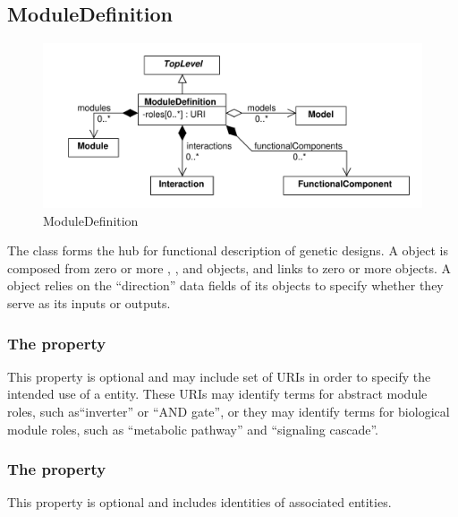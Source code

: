 \subsection{ModuleDefinition}
\label{sec:ModuleDefinition}

\begin{figure}[ht]
\begin{center}
\includegraphics[scale=0.6]{uml/module_definition}
\caption[]{ModuleDefinition}
\label{uml:module_definition}
\end{center}
\end{figure}

The  class forms the hub for functional description of genetic designs. A  object is composed from zero or more , , and  objects, and links to zero or more  objects. A  object relies on the ``direction'' data fields of its  objects to specify whether they serve as its inputs or outputs.

\subsubsection*{The  property}
This property is optional and may include  set of URIs in order to specify the intended use of a  entity. These URIs may identify terms for abstract module roles, such as``inverter'' or ``AND gate'', or they may identify terms for biological module roles, such as ``metabolic pathway'' and ``signaling cascade''.

\subsubsection*{The  property}
This property is optional and includes identities of associated  entities.

